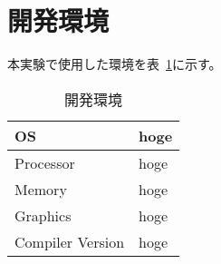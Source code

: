 \section{開発環境}
\label{sec:env}
本実験で使用した環境を表~\ref{tab:env}に示す。

\begin{table}[!ht]
    \caption{開発環境}
    \label{tab:env}
    \begin{center}
        \begin{tabular}{ll}
            \hline
            OS & hoge \\ \hline
            Processor & hoge \\ \hline
            Memory & hoge \\ \hline
            Graphics & hoge \\ \hline
            Compiler Version & hoge \\ \hline
        \end{tabular}
    \end{center}
\end{table}%
